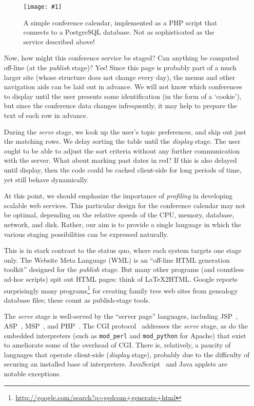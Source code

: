 \documentclass[preprint]{acm_proc_article-sp}
\newcommand{\myfig}[3]{%
  \begin{figure}[tbp]%
    #3%
    \caption{#2}%
    \label{fig:#1}%
  \end{figure}}
\newcommand{\screenshot}[2]{%
  \myfig{#1}{#2}
  {\centering%
    \texttt{[image: \#1]}}}
\begin{document}
\screenshot{confcal}{A simple conference calendar,
  implemented as a PHP script that connects to a PostgreSQL
  database.  Not as sophisticated as the service described
  above!}

Now, how might this conference service be staged?  Can
anything be computed off-line (at the \emph{publish} stage)?
Yes!  Since this page is probably part of a much larger site
(whose structure does not change every day), the menus and
other navigation aids can be laid out in advance.  We will
not know which conferences to display until the user
presents some identification (in the form of a `cookie'),
but since the conference data changes infrequently, it may
help to prepare the text of each row in advance.

During the \emph{serve} stage, we look up the user's topic
preferences, and ship out just the matching rows.  We delay
sorting the table until the \emph{display} stage.  The user
ought to be able to adjust the sort criteria without any
further communication with the server.  What about marking
past dates in red?  If this is also delayed until display,
then the code could be cached client-side for long periods
of time, yet still behave dynamically.

At this point, we should emphasize the importance of
\emph{profiling} in developing scalable web services.  This
particular design for the conference calendar may not be
optimal, depending on the relative speeds of the CPU,
memory, database, network, and disk.  Rather, our aim is to
provide a single language in which the various staging
possibilities can be expressed naturally.

This is in stark contrast to the status quo, where each
system targets one stage only.  The Website Meta Language
(WML) \cite{engelschall-wml} is an ``off-line HTML
generation toolkit'' designed for the \emph{publish} stage.
But many other programs (and countless ad-hoc scripts) spit
out HTML pages: think of \LaTeX2HTML.  Google
reports surprisingly many
programs\footnote{\url{http://google.com/search?q=gedcom+generate+html}}
for creating family tree web sites from genealogy database
files; these count as publish-stage tools.

The \emph{serve} stage is well-served by the ``server page''
languages, including JSP~\cite{sun-jsp},
ASP~\cite{microsoft-asp},
MSP~\cite{elsman03web}, and
PHP~\cite{bakken04php}.  The CGI protocol~\cite{w3c-cgi}
addresses the \emph{serve} stage, as do the embedded
interpreters (such as \texttt{mod\_perl} and
\texttt{mod\_python} for Apache) that exist to ameliorate some
of the overhead of CGI.
There is, relatively, a paucity of languages that operate
client-side (\emph{display} stage), probably due to the
difficulty of securing an installed base of interpreters.
JavaScript~\cite{netscape-javascript} and Java applets are
notable exceptions.
\end{document}
